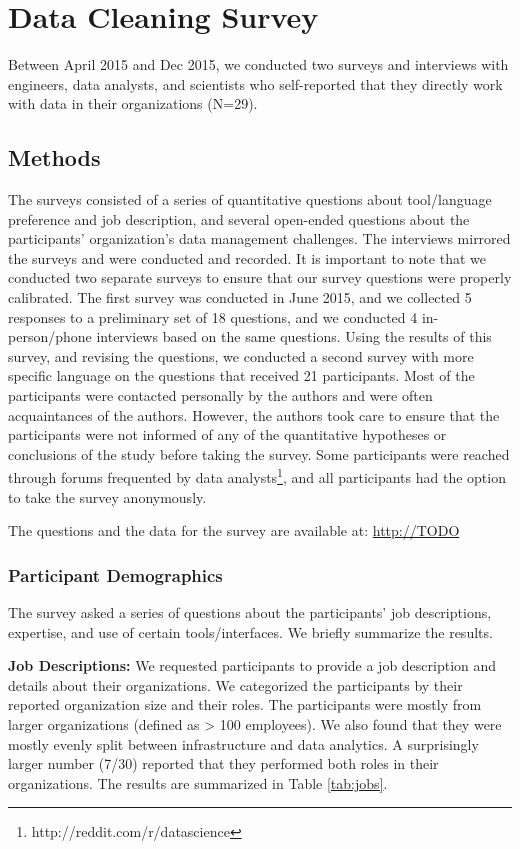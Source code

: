 \section{Data Cleaning Survey}
Between April 2015 and Dec 2015, we conducted two surveys and interviews with engineers, data analysts, and scientists who self-reported that they directly work with data in their organizations (N=29).

\subsection{Methods}\label{sec:survey}
The surveys consisted of a series of quantitative questions about tool/language preference and job description, and several open-ended questions about the participants' organization's data management challenges. The interviews mirrored the surveys and were conducted and recorded. It is important to note that we conducted two separate surveys to ensure that our survey questions were properly calibrated. The first survey was conducted in June 2015, and we collected 5 responses to a preliminary set of 18 questions, and we conducted 4 in-person/phone interviews based on the same questions. Using the results of this survey, and revising the questions, we conducted a second survey with more specific language on the questions that received 21 participants. 
Most of the participants were contacted personally by the authors and were often acquaintances of the authors. However, the authors took care to ensure that the participants were not informed of any of the quantitative hypotheses or conclusions of the study before taking the survey. 
Some participants were reached through forums frequented by data analysts\footnote{http://reddit.com/r/datascience}, and all participants had the option to take the survey anonymously.

The questions and the data for the survey are available at: \url{http://TODO}

\subsubsection{Participant Demographics}
The survey asked a series of questions about the participants' job descriptions, expertise, and use of certain tools/interfaces.
We briefly summarize the results.

\vspace{0.5em}

\noindent\textbf{Job Descriptions: } We requested participants to provide a job description and details about their organizations. We categorized the participants by their reported organization size and their roles. The participants were mostly from larger organizations (defined as > 100 employees). We also found that they were mostly evenly split between infrastructure and data analytics. A surprisingly larger number (7/30) reported that they performed both roles in their organizations. The results are summarized in Table \ref{tab:jobs}. 

